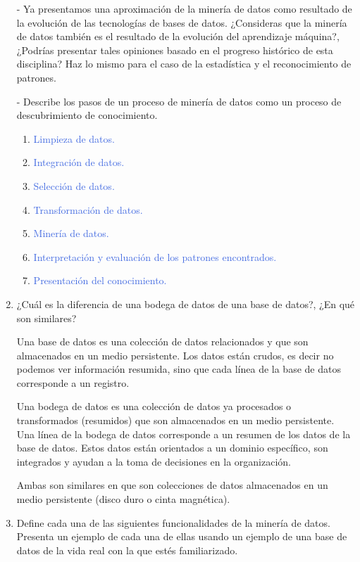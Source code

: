 \documentclass{article}
\begin{document}
\begin{enumerate}
- Ya presentamos una aproximación de la minería de datos como resultado de la
evolución de las tecnologías de bases de datos. ¿Consideras que la minería de
datos también es el resultado de la evolución del aprendizaje máquina?, ¿Podrías
presentar tales opiniones basado en el progreso histórico de esta disciplina?
Haz lo mismo para el caso de la estadística y el reconocimiento de patrones.

- Describe los pasos de un proceso de minería de datos como un proceso de
descubrimiento de conocimiento.

\begin{enumerate}
    \item \textcolor{RoyalBlue}{Limpieza de datos.}
    \item \textcolor{RoyalBlue}{Integración de datos.}
    \item \textcolor{RoyalBlue}{Selección de datos.}
    \item \textcolor{RoyalBlue}{Transformación de datos.}
    \item \textcolor{RoyalBlue}{Minería de datos.}
    \item \textcolor{RoyalBlue}{Interpretación y evaluación de los patrones encontrados.}
    \item \textcolor{RoyalBlue}{Presentación del conocimiento.}
\end{enumerate}



\pagebreak
\item ¿Cuál es la diferencia de una bodega de datos de una base de datos?, ¿En
qué son similares?

\textcolor{NavyBlue}{Una base de datos es una colección de datos relacionados y
que son almacenados en un medio persistente. Los datos están crudos, es decir no
podemos ver información resumida, sino que cada línea de la base de datos
corresponde a un registro. }

\textcolor{NavyBlue}{Una bodega de datos es una colección de datos ya procesados
o transformados (resumidos) que son almacenados en un medio persistente. Una
línea de la bodega de datos corresponde a un resumen de los datos de la base de
datos. Estos datos están orientados a un dominio específico, son integrados y
ayudan a la toma de decisiones en la organización.}

Ambas son similares en que son colecciones de datos almacenados en un medio
persistente (disco duro o cinta magnética).

\pagebreak
\item Define cada una de las siguientes funcionalidades de la minería de datos.
Presenta un ejemplo de cada una de ellas usando un ejemplo de una base de datos
de la vida real con la que estés familiarizado.


\end{enumerate}
\end{document}

